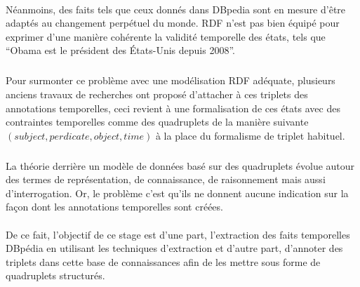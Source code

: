 \paragraph{}
Néanmoins, des faits tels que ceux donnés dans DBpedia sont en mesure d’être adaptés au changement perpétuel du monde.
RDF n’est pas bien équipé pour exprimer d’une manière cohérente la validité temporelle des états, tels que “Obama est le président des États-Unis depuis 2008”. 
\subparagraph{}
Pour surmonter ce problème avec une modélisation RDF adéquate, plusieurs anciens travaux de recherches ont proposé d’attacher à ces triplets des annotations temporelles, ceci revient à une formalisation de ces états avec des contraintes temporelles comme des quadruplets de la manière suivante $(subject, perdicate, object, time)$ à la place du formalisme de triplet habituel.
\subparagraph{}
La théorie derrière un modèle de données basé sur des quadruplets évolue autour des termes de représentation, de connaissance, de raisonnement mais aussi d’interrogation. Or, le problème c’est qu’ils ne donnent aucune indication sur la façon dont les annotations temporelles sont créées.
\paragraph{}
De ce fait, l’objectif de ce stage est d’une part, l’extraction des faits temporelles DBpédia en utilisant les techniques d'extraction et d’autre part, d’annoter des triplets dans cette base de connaissances afin de les mettre sous forme de quadruplets structurés.
